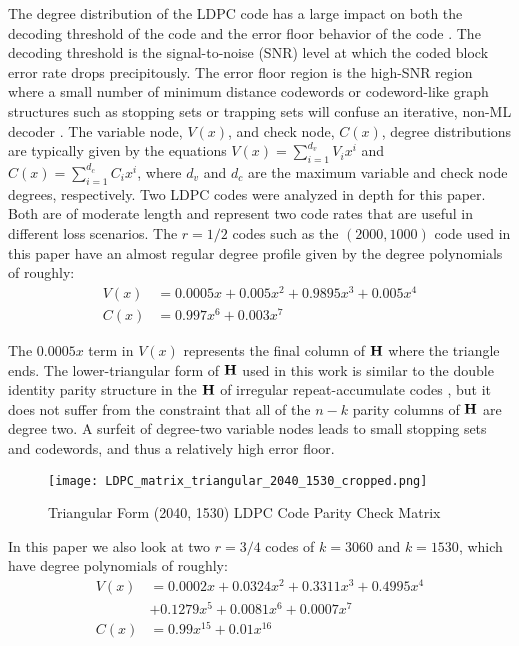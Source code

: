 \documentclass[conference]{IEEEtran}
\begin{document}
The degree distribution of the LDPC code has a large impact on both the decoding threshold of the code and the error floor behavior of the code \cite{luby-01}.  The decoding threshold is the signal-to-noise (SNR) level at which the coded block error rate drops precipitously.  The error floor region is the high-SNR region where a small number of minimum distance codewords or codeword-like graph structures such as stopping sets or trapping sets will confuse an iterative, non-ML decoder \cite{cole_2-06}.  The variable node, $V(x)$, and check node, $C(x)$, degree distributions are typically given by the equations $V(x) = \sum_{i = 1}^{d_v} V_i x^i$ and $C(x) = \sum_{i = 1}^{d_c} C_i x^i$, where $d_v$ and $d_c$ are the maximum variable and check node degrees, respectively.  Two LDPC codes were analyzed in depth for this paper.  Both are of moderate length and represent two code rates that are useful in different loss scenarios.  The $r={1}/{2}$ codes such as the $(2000, 1000)$ code used in this paper have an almost regular degree profile given by the degree polynomials of roughly:
\begin{align*}
  V(x) &= 0.0005x + 0.005x^2 + 0.9895x^3 + 0.005x^4 \\
  C(x) &= 0.997x^6 + 0.003x^7
\end{align*}

The $0.0005x$ term in $V(x)$ represents the final column of $\bf{H}$ where the triangle ends.  The lower-triangular form of $\bf{H}$ used in this work is similar to the double identity parity structure in the $\bf{H}$ of irregular repeat-accumulate codes \cite{Jin-2000}, but it does not suffer from the constraint that all of the $n-k$ parity columns of $\bf{H}$ are degree two.  A surfeit of degree-two variable nodes leads to small stopping sets and codewords, and thus a relatively high error floor.  

\begin{figure*}[!ht]
\centering
\texttt{[image: LDPC\_matrix\_triangular\_2040\_1530\_cropped.png]}
\caption{Triangular Form (2040, 1530) LDPC Code Parity Check Matrix  \label{fig:LDPC_matrix_triangular}}
\end{figure*}

In this paper we also look at two $r={3}/{4}$ codes of $k=3060$ and $k=1530$, which have degree polynomials of roughly:
\begin{align*}
  V(x) &= 0.0002x + 0.0324x^2 + 0.3311x^3 + 0.4995x^4 \\
       & + 0.1279x^5 + 0.0081x^6  + 0.0007x^7 \\
  C(x) &= 0.99x^{15} + 0.01x^{16}
\end{align*}
\end{document}
